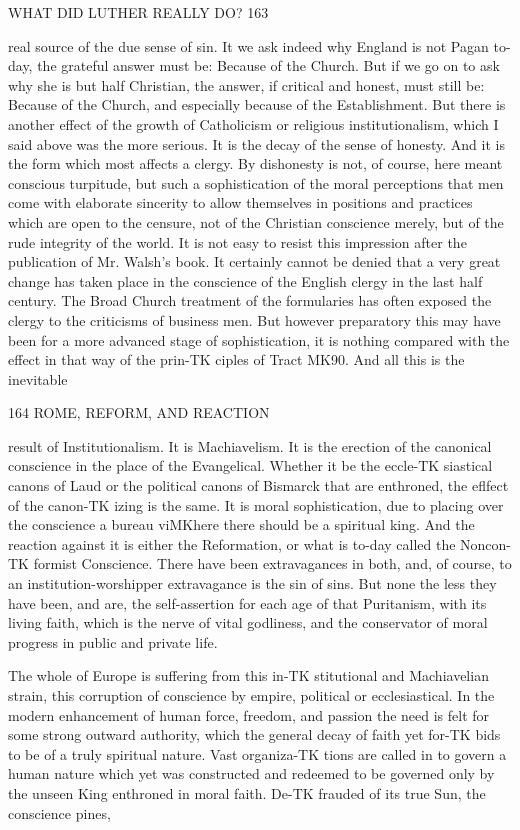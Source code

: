 \documentclass[12pt,a5paper,oneside]{book}
\begin{document}
{WHAT DID LUTHER REALLY DO? 163 

real source of the due sense of sin. It we ask indeed 
why England is not Pagan to-day, the grateful answer 
must be: Because of the Church. But if we go on 
to ask why she is but half Christian, the answer, if 
critical and honest, must still be: Because of the 
Church, and especially because of the Establishment. 
But there is another effect of the growth of 
Catholicism or religious institutionalism, which I 
said above was the more serious. It is the decay of 
the sense of honesty. And it is the form which 
most affects a clergy. By dishonesty is not, of 
course, here meant conscious turpitude, but such a 
sophistication of the moral perceptions that men 
come with elaborate sincerity to allow themselves in 
positions and practices which are open to the censure, 
not of the Christian conscience merely, but of the 
rude integrity of the world. It is not easy to resist 
this impression after the publication of Mr. Walsh's 
book. It certainly cannot be denied that a very 
great change has taken place in the conscience of 
the English clergy in the last half century. The 
Broad Church treatment of the formularies has often 
exposed the clergy to the criticisms of business men. 
But however preparatory this may have been for a 
more advanced stage of sophistication, it is nothing 
compared with the effect in that way of the prin-TK
ciples of Tract MK90. And all this is the inevitable 



164 ROME, REFORM, AND REACTION 

result of Institutionalism. It is Machiavelism. It 
is the erection of the canonical conscience in the 
place of the Evangelical. Whether it be the eccle-TK
siastical canons of Laud or the political canons of 
Bismarck that are enthroned, the eflfect of the canon-TK
izing is the same. It is moral sophistication, due to 
placing over the conscience a bureau viMKhere there should 
be a spiritual king. And the reaction against it is either 
the Reformation, or what is to-day called the Noncon-TK
formist Conscience. There have been extravagances 
in both, and, of course, to an institution-worshipper 
extravagance is the sin of sins. But none the less 
they have been, and are, the self-assertion for each 
age of that Puritanism, with its living faith, which 
is the nerve of vital godliness, and the conservator 
of moral progress in public and private life. 

The whole of Europe is suffering from this in-TK
stitutional and Machiavelian strain, this corruption 
of conscience by empire, political or ecclesiastical. 
In the modern enhancement of human force, freedom, 
and passion the need is felt for some strong outward 
authority, which the general decay of faith yet for-TK
bids to be of a truly spiritual nature. Vast organiza-TK
tions are called in to govern a human nature which yet 
was constructed and redeemed to be governed only by 
the unseen King enthroned in moral faith. De-TK
frauded of its true Sun, the conscience pines, 



}
\end{document}

